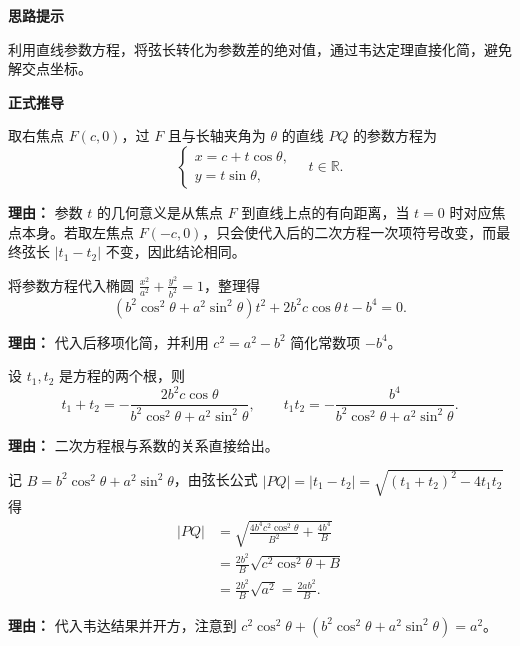 \begin{proofbox}

	\textbf{\textcolor{CProof}{思路提示}}

	利用直线参数方程，将弦长转化为参数差的绝对值，通过韦达定理直接化简，避免解交点坐标。

	\medskip

	\textbf{\textcolor{CProof}{正式推导}}
	\begin{description}[style=nextline, leftmargin=2.8em, labelsep=0.5em, itemsep=0.55em]

		\item[\textbf{步骤一（设参数方程）：}] 取右焦点 $F(c,0)$，过 $F$ 且与长轴夹角为 $\theta$ 的直线 $PQ$ 的参数方程为
		      \[
			      \begin{cases}
				      x = c + t\cos\theta, \\
				      y = t\sin\theta,
			      \end{cases}
			      \quad t\in\mathbb{R}.
		      \]
		      \par\textbf{理由：} 参数 $t$ 的几何意义是从焦点 $F$ 到直线上点的有向距离，当 $t=0$ 时对应焦点本身。若取左焦点 $F(-c,0)$，只会使代入后的二次方程一次项符号改变，而最终弦长 $|t_1-t_2|$ 不变，因此结论相同。

		\item[\textbf{步骤二（代入椭圆）：}] 将参数方程代入椭圆 $\displaystyle\frac{x^2}{a^2}+\frac{y^2}{b^2}=1$，整理得
		      \[
			      (b^2\cos^2\theta + a^2\sin^2\theta)t^2 + 2b^2c\cos\theta\,t - b^4 = 0.
		      \]
		      \par\textbf{理由：} 代入后移项化简，并利用 $c^2=a^2-b^2$ 简化常数项 $-b^4$。

		\item[\textbf{步骤三（韦达定理）：}] 设 $t_1,t_2$ 是方程的两个根，则
		      \[
			      t_1+t_2 = -\frac{2b^2c\cos\theta}{b^2\cos^2\theta + a^2\sin^2\theta},\qquad
			      t_1t_2 = -\frac{b^4}{b^2\cos^2\theta + a^2\sin^2\theta}.
		      \]
		      \par\textbf{理由：} 二次方程根与系数的关系直接给出。

		\item[\textbf{步骤四（求弦长）：}] 记 $B = b^2\cos^2\theta + a^2\sin^2\theta$，由弦长公式 $|PQ| = |t_1-t_2| = \sqrt{(t_1+t_2)^2 - 4t_1t_2}$ 得
		      \[
			      \begin{aligned}
				      |PQ| & = \sqrt{ \frac{4b^4c^2\cos^2\theta}{B^2} + \frac{4b^4}{B} } \\
				           & = \frac{2b^2}{B} \sqrt{ c^2\cos^2\theta + B }               \\
				           & = \frac{2b^2}{B} \sqrt{ a^2 } = \frac{2ab^2}{B}.
			      \end{aligned}
		      \]
		      \par\textbf{理由：} 代入韦达结果并开方，注意到 $c^2\cos^2\theta + (b^2\cos^2\theta+a^2\sin^2\theta) = a^2$。


\end{description}
\end{proofbox}
